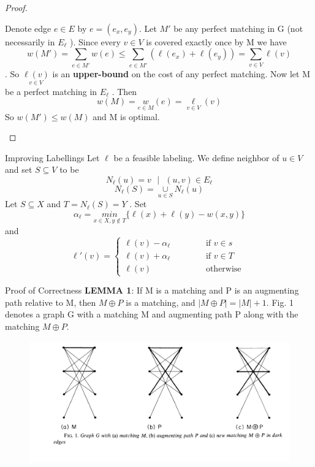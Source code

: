 \begin{proof}
\begin{small}


Denote edge $e \in E$ by $e = (e_x , e_y )$.
Let $M'$ be any perfect matching in G (not necessarily in $E _\ell$ ).
Since every $v \in V$ is covered exactly once by M we
have $$w(M') = \sum _{e \in M'}w(e) \leq \sum _{e \in M'} (\ell(e_x ) + \ell(e_y )) = \sum _{v\in V} \ell(v)$$.
So $\underset{{v\in V}}{\ell(v)}$ is an \textbf{upper-bound} on the cost of any perfect matching.
Now let M be a perfect matching in $E_\ell$ . Then
$$w(M) = \underset{{e\in M}} w(e) = \underset{{v\in V}} \ell(v)$$
So $w(M')\leq w(M)$ and M is optimal.
\end{small}
\end{proof}

\begin{frame}{Improving Labellings}
Let $\ell$ be a feasible labeling.
We define neighbor of $u \in V$ and set $S \subseteq V$ to be
$$N_\ell (u) = {v\mbox{ } |\mbox{ } (u, v) \in E_\ell }$$
$$N_\ell (S) = \underset{u\in S}{\cup} N_\ell (u)$$
Let $S \subseteq X$ and $T = N_\ell (S) = Y$ . Set $$\alpha_\ell =\underset{x\in X,y \notin T}{ min} \{\ell(x) + \ell(y) - w(x, y)\}$$ and
\begin{equation*}
\ell'(v)=
\left\{ \begin{array}{ll}
\ell(v)-\alpha_\ell  \qquad \quad   & \mbox{ if } v\in s\\
\ell(v)+\alpha_\ell    &  \mbox{ if }v\in T\\
\ell(v)              &  \mbox{ otherwise }
\end{array}\right.
\end{equation*}
\end{frame}


\begin{frame}{Proof of Correctness}
\textbf{LEMMA 1}: If M is a matching and P is an augmenting path relative to M, then
$ M\oplus P$  is a matching, and $| M \oplus P | = | M | + 1 $. 
Fig. 1 denotes a graph G with a matching M and augmenting path P along with the matching $M \oplus P$.\\
\begin{figure}[h!]
\centering
\includegraphics[width=1\textwidth]{graph}
\end{figure}
\end{frame}

